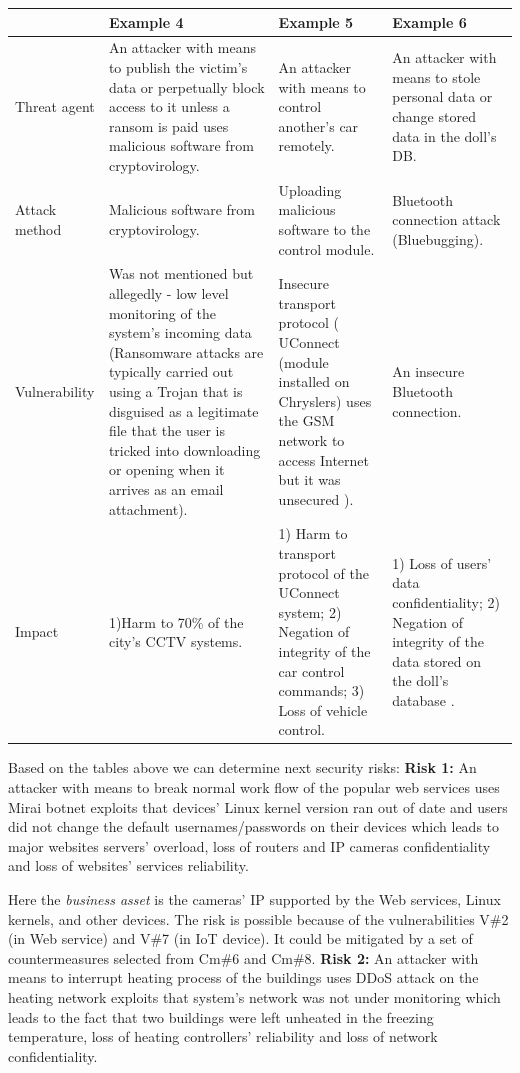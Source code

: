 \documentclass[12pt]{article}
\begin{document}
\begin{adjustbox}{angle=90}
	\begin{tabular}{ | l | p{5cm} | p{5cm} | p{5cm} |}
		\hline
		& Example 4 ~\cite{Ex4} & Example 5 ~\cite{Ex5} & Example 6  ~\cite{Ex6}\\ \hline
		Threat agent & An attacker with means to publish the victim's data or perpetually block access to it unless a ransom is paid uses malicious software from cryptovirology. 
		&
		An attacker with means to control another’s car remotely.
		& 
		An attacker with means to stole personal data or change stored data in the doll's DB.  \\  \hline
		Attack method & Malicious software from cryptovirology. 
		& 
		Uploading malicious software to the control module. 
		& 
		Bluetooth connection attack (Bluebugging). \\ \hline
		Vulnerability & Was not mentioned but allegedly - low level monitoring of the system's incoming data (Ransomware attacks are typically carried out using a Trojan that is disguised as a legitimate file that the user is tricked into downloading or opening when it arrives as an email attachment).
		& Insecure transport protocol ( UConnect (module installed on Chryslers) uses the GSM network to access Internet but it was unsecured ).
		& 
		An insecure Bluetooth connection.  \\ \hline
		Impact & 1)Harm to 70\% of the city’s CCTV systems.
		& 
		1) Harm to transport protocol of the UConnect system;
		2) Negation of integrity of the car control commands;
		3) Loss of vehicle control. 
		& 
		1) Loss of users' data confidentiality;
		2) Negation of integrity of the data stored on the doll's database .\\ \hline
	\end{tabular}
\end{adjustbox}


\newpage
Based on the tables above we can determine next security risks:
\vspace*{1ex}
\newline\textbf{Risk 1:} An attacker with means to break normal work flow of the popular web services uses Mirai botnet exploits that devices' Linux kernel version ran out of date and users did not change the default usernames/passwords on their devices which leads to major websites servers' overload, loss of routers and IP cameras confidentiality and loss of websites' services reliability.
	
	Here the \textit{business asset} is the cameras’ IP supported by the Web services, Linux kernels, and other devices. The risk is possible because of the vulnerabilities V\#2 (in Web service) and V\#7 (in IoT device). It could be mitigated by a set of countermeasures selected from Cm\#6 and Cm\#8.
	\vspace*{1ex}
	\newline\textbf{Risk 2:} An attacker with means to interrupt heating process of the buildings uses DDoS attack on the heating network exploits that system's network was not under monitoring which leads to the fact that two buildings were left unheated in the freezing temperature, loss of heating controllers' reliability and loss of network confidentiality.
	
\end{document}
